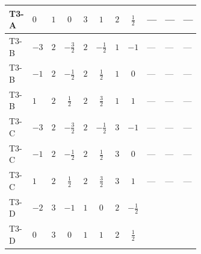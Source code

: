 \documentclass[8pt]{article}
\begin{document}
\begin{landscape}
\begin{longtable}{@{}llcccccc >{\raggedright\arraybackslash}p{0.21\linewidth} >{\raggedright\arraybackslash}p{0.21\linewidth} >{\raggedright\arraybackslash}p{0.21\linewidth}@{}}
\midrule
T3-A & $0$ & $1$ & $0$ & $3$ & $1$ & $2$ & $\frac{1}{2}$ & --- & --- & --- \\
\midrule
T3-B & $-3$ & $2$ & $-\frac{3}{2}$ & $2$ & $-\frac{1}{2}$ & $1$ & $-1$ & --- & --- & --- \\
\midrule
T3-B & $-1$ & $2$ & $-\frac{1}{2}$ & $2$ & $\frac{1}{2}$ & $1$ & $0$ & --- & --- & --- \\
\midrule
T3-B & $1$ & $2$ & $\frac{1}{2}$ & $2$ & $\frac{3}{2}$ & $1$ & $1$ & --- & --- & --- \\
\midrule
T3-C & $-3$ & $2$ & $-\frac{3}{2}$ & $2$ & $-\frac{1}{2}$ & $3$ & $-1$ & --- & --- & --- \\
\midrule
T3-C & $-1$ & $2$ & $-\frac{1}{2}$ & $2$ & $\frac{1}{2}$ & $3$ & $0$ & --- & --- & --- \\
\midrule
T3-C & $1$ & $2$ & $\frac{1}{2}$ & $2$ & $\frac{3}{2}$ & $3$ & $1$ & --- & --- & --- \\
\midrule
T3-D & $-2$ & $3$ & $-1$ & $1$ & $0$ & $2$ & $-\frac{1}{2}$ & \scriptsize\adjustbox{max width=\linewidth}{$\begin{gathered} {\lambda_{HS_1}^{(1)}} (2 T_{\nu}^{(1)}+6 \operatorname{Tr}\!\left({Y_d}\,\left({Y_d}\right)^{\dagger}\right)+2 \operatorname{Tr}\!\left({Y_e}\,\left({Y_e}\right)^{\dagger}\right)+6 \operatorname{Tr}\!\left({Y_u}\,\left({Y_u}\right)^{\dagger}\right)+4 {\lambda_{S_1}^{(A)}})\end{gathered}$} & \scriptsize\adjustbox{max width=\linewidth}{$\begin{gathered} +6 {g_2}^4\end{gathered}$} & \scriptsize\adjustbox{max width=\linewidth}{$\begin{gathered} +6 {\lambda_{HS_1}^{(A)}}^2\end{gathered}$} \\
\midrule
T3-D & $0$ & $3$ & $0$ & $1$ & $1$ & $2$ & $\frac{1}{2}$ & \scriptsize\adjustbox{max width=\linewidth}{$\begin{gathered} {\lambda_{HS_1}^{(1)}} (2 T_{\nu}^{(1)}+6 \operatorname{Tr}\!\left({Y_d}\,\left({Y_d}\right)^{\dagger}\right)+2 \operatorname{Tr}\!\left({Y_e}\,\left({Y_e}\right)^{\dagger}\right)+6 \operatorname{Tr}\!\left({Y_u}\,\left({Y_u}\right)^{\dagger}\right)+4 {\lambda_{S_1}^{(A)}})\end{gathered}$} & \scriptsize\adjustbox{max width=\linewidth}{$\begin{gathered} +6 {g_2}^4\end{gathered}$} & \scriptsize\adjustbox{max width=\linewidth}{$\begin{gathered} +6 {\lambda_{HS_1}^{(A)}}^2\end{gathered}$} \\

\end{longtable}
\end{landscape}
\end{document}

